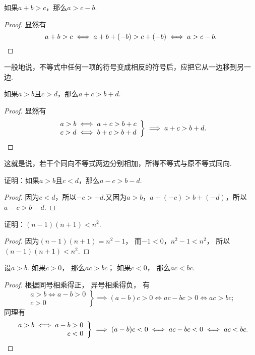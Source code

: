 \begin{corollary}
如果\(a+b>c\)，那么\(a>c-b\).
\begin{proof}
显然有\[
a+b>c
\iff a+b+(-b)>c+(-b)
\iff a>c-b.
\qedhere
\]
\end{proof}
\end{corollary}
一般地说，不等式中任何一项的符号变成相反的符号后，应把它从一边移到另一边.

\begin{corollary}
如果\(a>b\)且\(c>d\)，那么\(a+c>b+d\).
\begin{proof}
显然有\[
\left. \begin{array}{c}
a>b \iff a+c>b+c \\
c>d \iff b+c>b+d
\end{array} \right\}
\implies a+c>b+d.
\qedhere
\]
\end{proof}
\end{corollary}
这就是说，若干个同向不等式两边分别相加，所得不等式与原不等式同向.

\begin{example}
证明：如果\(a > b\)且\(c < d\)，那么\(a - c > b - d\).
\begin{proof}
因为\(c < d\)，所以\(-c > -d\).又因为\(a > b\)，\(a + (-c) > b + (-d)\)，所以\(a - c > b - d\).
\end{proof}
\end{example}

\begin{example}
证明：\((n-1)(n+1)<n^2\).
\begin{proof}
因为\((n-1)(n+1)=n^2-1\)，
而\(-1<0\)，\(n^2-1<n^2\)，
所以\((n-1)(n+1)<n^2\).
\end{proof}
\end{example}

\begin{theorem}
设\(a>b\).
如果\(c>0\)，
那么\(ac>bc\)；
如果\(c<0\)，
那么\(ac<bc\).
\begin{proof}
根据同号相乘得正，
异号相乘得负，
有\[
	\left. \begin{array}{r}
		a>b \iff a-b>0 \\
		c>0
	\end{array} \right\}
	\implies (a-b)c>0
	\iff ac-bc>0
	\iff ac>bc;
\]
同理有\[
	\left. \begin{array}{r}
		a>b \iff a-b> 0 \\
		c<0
	\end{array} \right\}
	\implies (a-b)c<0
	\iff ac-bc<0
	\iff ac<bc.
	\qedhere
\]
\end{proof}
\end{theorem}

